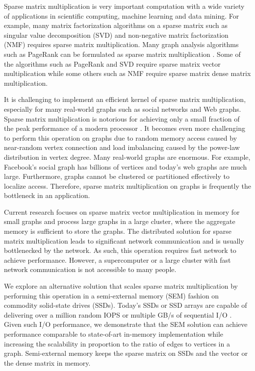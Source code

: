Sparse matrix multiplication is very important computation with a wide variety
of applications in scientific computing, machine learning and data mining.
For example, many matrix factorization algorithms on a sparse matrix such as
singular value decomposition (SVD) \cite{svd} and non-negative matrix
factorization (NMF) \cite{nmf} requires sparse matrix multiplication.
Many graph analysis algorithms such as PageRank \cite{pagerank} can be
formulated as sparse matrix multiplication \cite{Mattson13}. Some of
the algorithms such as PageRank and SVD require sparse matrix vector
multiplication while some others such as NMF require sparse matrix dense
matrix multiplication.


It is challenging to implement an efficient kernel of sparse matrix
multiplication, especially for many real-world graphs such as social networks
and Web graphs. Sparse matrix multiplication is notorious for achieving only
a small fraction of the peak performance of a modern processor \cite{Williams07}.
It becomes even more challenging to perform this operation on graphs due to
random memory access caused by near-random vertex connection and load imbalancing
caused by the power-law distribution in vertex degree. Many real-world graphs
are enormous. For example, Facebook's social graph has billions of vertices
and today's web graphs are much large. Furthermore, graphs cannot be
clustered or partitioned effectively \cite{leskovec} to localize access.
Therefore, sparse matrix multiplication on graphs is frequently the bottleneck
in an application.

Current research focuses on sparse matrix vector multiplication in memory for
small graphs and process large graphs in a large
cluster, where the aggregate memory is sufficient to store the graphs.
The distributed solution for sparse matrix multiplication leads to significant
network communication and is usually bottlenecked by the network.
As such, this operation requires fast network to achieve performance.
However, a supercomputer or a large cluster with fast network communication
is not accessible to many people.



We explore an alternative solution that scales sparse matrix multiplication
by performing this operation in a semi-external memory (SEM) fashion on commodity
solid-state drives (SSDs). Today's SSDs or SSD arrays are capable of delivering
over a million random IOPS or multiple GB/s of sequential I/O \cite{safs}.
Given such I/O performance, we demonstrate that the SEM solution can achieve
performance comparable to
state-of-art in-memory implementation while increasing the scalability
in proportion to the ratio of edges to vertices in a graph. Semi-external
memory \cite{flashgraph, Abello98} keeps the sparse matrix on SSDs and
the vector or the dense matrix in memory.

